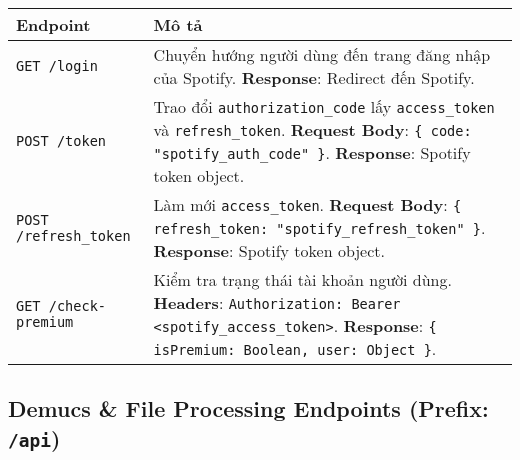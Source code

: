 \documentclass[12pt,a4paper]{article}
\begin{document}
\begin{longtable}{|p{4cm}|p{11cm}|}
\hline
\textbf{Endpoint} & \textbf{Mô tả} \\
\hline
\endhead

\texttt{GET /login} & Chuyển hướng người dùng đến trang đăng nhập của Spotify. \textbf{Response}: Redirect đến Spotify. \\
\hline

\texttt{POST /token} & Trao đổi \texttt{authorization\_code} lấy \texttt{access\_token} và \texttt{refresh\_token}. \textbf{Request Body}: \texttt{\{ code: "spotify\_auth\_code" \}}. \textbf{Response}: Spotify token object. \\
\hline

\texttt{POST /refresh\_token} & Làm mới \texttt{access\_token}. \textbf{Request Body}: \texttt{\{ refresh\_token: "spotify\_refresh\_token" \}}. \textbf{Response}: Spotify token object. \\
\hline

\texttt{GET /check-premium} & Kiểm tra trạng thái tài khoản người dùng. \textbf{Headers}: \texttt{Authorization: Bearer <spotify\_access\_token>}. \textbf{Response}: \texttt{\{ isPremium: Boolean, user: Object \}}. \\
\hline
\end{longtable}

\subsection{Demucs \& File Processing Endpoints (Prefix: \texttt{/api})}
\label{subsec:demucs-endpoints}
\end{document}
